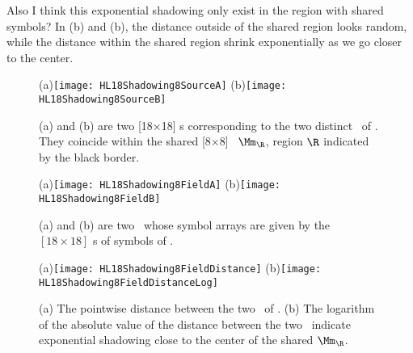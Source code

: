\begin{description}
{Also I think this exponential shadowing only exist in the region with shared symbols? In  (b) and  (b), the distance outside of the shared region looks random, while the distance within the shared region shrink exponentially as we go closer to the center.
	}
	
\begin{figure}
  \centering
(a)\texttt{[image: HL18Shadowing8SourceA]}
(b)\texttt{[image: HL18Shadowing8SourceB]}
  \caption{\label{fig:HL18Shadowing8Source}
(a) and (b) are two {\admissible} [18$\times$18] \brick s corresponding to the two
distinct \twots\ of . They coincide within the shared
[8$\times$8] \brick\  $\Mm_\R$, region $\R$ indicated by the black border.
}
\end{figure}

\begin{figure}
  \centering
(a)\texttt{[image: HL18Shadowing8FieldA]}
(b)\texttt{[image: HL18Shadowing8FieldB]}
  \caption{\label{fig:HL18Shadowing8Field}
(a) and (b) are two \twots\ whose symbol arrays are given by the $[18\times18]$ \brick s of symbols of .
}
\end{figure}

\begin{figure}
  \centering
(a)\texttt{[image: HL18Shadowing8FieldDistance]}
(b)\texttt{[image: HL18Shadowing8FieldDistanceLog]}
  \caption{\label{fig:HL18Shadowing8Distance}
(a) The pointwise distance between the two \twots\ of .
(b) The logarithm of the absolute value of the distance between the two \twots\ indicate exponential shadowing close to the center of the shared $\Mm_\R$.
}
\end{figure}

	

\end{description}
